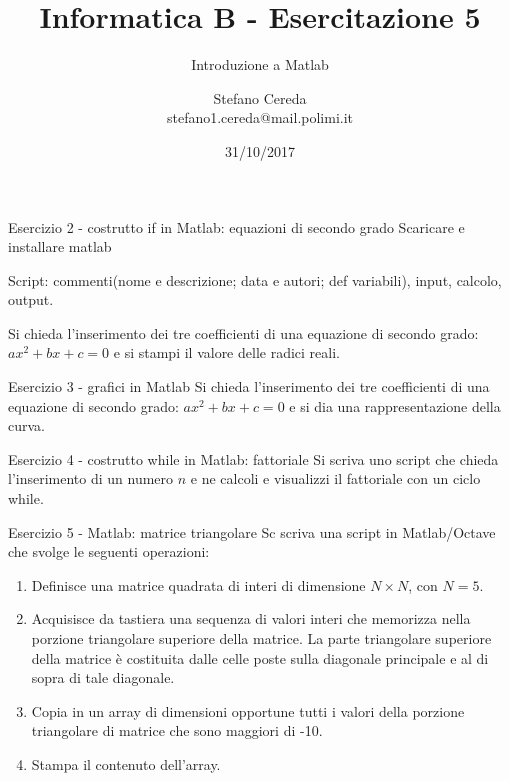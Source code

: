 \documentclass[]{beamer}
\title{Informatica B - Esercitazione 5}
\subtitle{Introduzione a Matlab}
\author{Stefano Cereda\\
		stefano1.cereda@mail.polimi.it
	}
\date{31/10/2017}
\institute[PoliMi]{\vspace{0.5cm}\centering Politecnico di Milano \\ \vspace{0.2cm}
	\texttt{[image: ./logopolimi]}}
\begin{document}
\begin{frame}
	\maketitle
\end{frame}




\begin{frame}{Esercizio 2 - costrutto if in Matlab: equazioni di secondo grado}
Scaricare e installare matlab

Script: commenti(nome e descrizione; data e autori; def variabili), input, calcolo, output.

Si chieda l’inserimento dei tre coefficienti di una equazione di secondo grado: $ax^2+bx+c=0$ e si stampi il valore delle radici reali.
\end{frame}

\begin{frame}{Esercizio 3 - grafici in Matlab}
Si chieda l’inserimento dei tre coefficienti di una equazione di secondo grado: $ax^2+bx+c=0$ e si dia una rappresentazione della curva.
\end{frame}

\begin{frame}{Esercizio 4 - costrutto while in Matlab: fattoriale}
Si scriva uno script che chieda l'inserimento di un numero $n$ e ne calcoli e visualizzi il fattoriale con un ciclo while.
\end{frame}

\begin{frame}{Esercizio 5 - Matlab: matrice triangolare}
Sc scriva una script in Matlab/Octave che svolge le seguenti operazioni:
\begin{enumerate}
	\item Definisce una matrice quadrata di interi di dimensione $N\times N$, con $N=5$.
	\item Acquisisce da tastiera una sequenza di valori interi che memorizza nella	porzione triangolare superiore della matrice. La parte triangolare superiore della matrice è costituita dalle celle poste sulla diagonale principale e al di sopra di tale diagonale.
	\item Copia in un array di dimensioni opportune tutti i valori della porzione triangolare di matrice che sono maggiori di -10.
	\item Stampa il contenuto dell’array.
\end{enumerate}
\end{frame}
\end{document}
